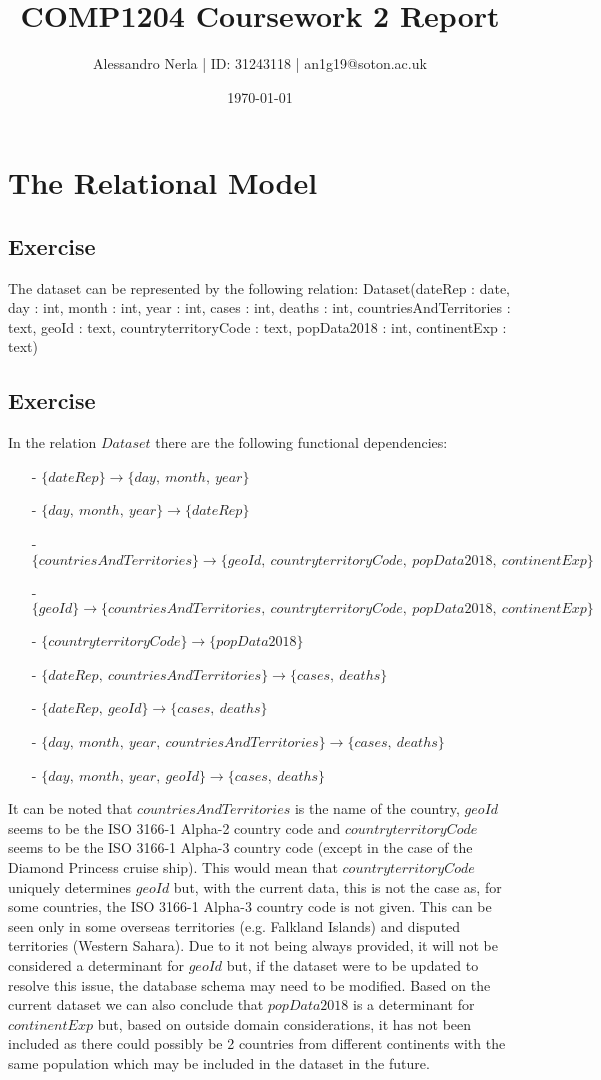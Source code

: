 \documentclass{article}
\title{COMP1204 Coursework 2 Report}
\author{Alessandro Nerla | ID: 31243118 | an1g19@soton.ac.uk}
\date{\today}
\newcounter{ex}
\newcommand{\exercise}{
\stepcounter{ex}
\subsection{Exercise \arabic{ex}}
}
\begin{document}
\maketitle
\section{The Relational Model}

\exercise
The dataset can be represented by the following relation: \newline\newline
Dataset(dateRep : date, day : int, month : int, year : int, cases : int, deaths : int, countriesAndTerritories : text, geoId : text, countryterritoryCode : text, popData2018 : int, continentExp : text)

\exercise
In the relation $Dataset$ there are the following functional dependencies:
\begin{itemize}
    \item[-] $\{ dateRep  \} \rightarrow \{ day,\ month,\ year \}$
    \item[-] $\{ day,\ month,\ year  \} \rightarrow \{ dateRep \}$
    \item[-] $\{ countriesAndTerritories  \} \rightarrow \{ geoId,\ countryterritoryCode,\ popData2018,\ continentExp \}$
    \item[-] $\{ geoId  \} \rightarrow \{ countriesAndTerritories,\ countryterritoryCode,\ popData2018,\ continentExp \}$
    \item[-] $\{ countryterritoryCode  \} \rightarrow \{ popData2018 \}$
    \item[-] $\{ dateRep,\ countriesAndTerritories  \} \rightarrow \{ cases,\ deaths \}$
    \item[-] $\{ dateRep,\ geoId  \} \rightarrow \{ cases,\ deaths \}$
    \item[-] $\{ day,\ month,\ year,\ countriesAndTerritories  \} \rightarrow \{ cases,\ deaths \}$
    \item[-] $\{ day,\ month,\ year,\ geoId  \} \rightarrow \{ cases,\ deaths \}$
\end{itemize}
It can be noted that $countriesAndTerritories$ is the name of the country, $geoId$ seems to be the ISO 3166-1 Alpha-2 country code and $countryterritoryCode$ seems to be the ISO 3166-1 Alpha-3 country code (except in the case of the Diamond Princess cruise ship). This would mean that $countryterritoryCode$ uniquely determines $geoId$ but, with the current data, this is not the case as, for some countries, the ISO 3166-1 Alpha-3 country code is not given. This can be seen only in some overseas territories (e.g. Falkland Islands) and disputed territories (Western Sahara). Due to it not being always provided, it will not be considered a determinant for $geoId$ but, if the dataset were to be updated to resolve this issue, the database schema may need to be modified. \newline
Based on the current dataset we can also conclude that $popData2018$ is a determinant for $continentExp$ but, based on outside domain considerations, it has not been included as there could possibly be 2 countries from different continents with the same population which may be included in the dataset in the future. 
\end{document}
